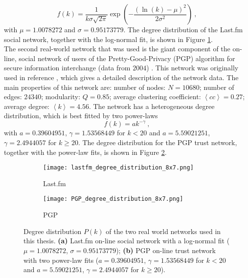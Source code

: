 \documentclass[11 pt , letterpaper , twoside , openright]{book}
\begin{document}
\begin{equation}
	f(k) = \frac{1}{k \sigma \sqrt{2\pi}} \exp(-\frac{(\ln(k) - \mu)^2}{2 \sigma^2})\ ,
\end{equation}
with $\mu = 1.0078272$ and $\sigma = 0.95173779$. The degree distribution of the Last.fm social network, together with the log-normal fit, is shown in Figure \ref{deg_distr_lastfm}.\\
\newline
The second real-world network that was used is the giant component of the on-line, social network of users of the Pretty-Good-Privacy (PGP) algorithm for secure information interchange (data from $2004$) \cite{ICON}. This network was originally used in reference \cite{Boguna2004}, which gives a detailed description of the network data. The main properties of this network are: number of nodes: $N = 10680$; number of edges: $24340$; modularity: $Q = 0.85$; average clustering coefficient: $\left<cc\right> = 0.27$; average degree: $\left<k\right> = 4.56$. The network has a heterogeneous degree distribution, which is best fitted by two power-laws
\begin{equation}
 f(k) = a k^{-\gamma} \ ,
\end{equation}
with $a = 0.39604951$, $\gamma = 1.53568449$ for $k < 20$ and $a = 5.59021251$, $\gamma = 2.4944057$ for $k \geqslant 20$. The degree distribution for the PGP trust network, together with the power-law fits, is shown in Figure \ref{deg_distr_pgp}. 

\begin{figure}[H]
  \begin{subfigure}[b]{0.49\textwidth}
    \caption{Last.fm}
    \texttt{[image: lastfm\_degree\_distribution\_8x7.png]}
    \label{deg_distr_lastfm}
  \end{subfigure}
  \begin{subfigure}[b]{0.49\textwidth}
    \caption{PGP}
    \texttt{[image: PGP\_degree\_distribution\_8x7.png]}
    \label{deg_distr_pgp}
  \end{subfigure}
  \captionsetup{format=plain}
  \caption[Degree distribution $P(k)$ of the two real-world networks used in this thesis.]{Degree distribution $P(k)$ of the two real world networks used in this thesis. \textbf{(a)} Last.fm on-line social network with a log-normal fit ($\mu = 1.0078272$, $\sigma = 0.95173779$); \textbf{(b)} PGP on-line trust network with two power-law fits ($a = 0.39604951$, $\gamma = 1.53568449$ for $k < 20$ and $a = 5.59021251$, $\gamma = 2.4944057$ for $k \geqslant 20$).}
\label{ev_op_50_50}
\end{figure}
\end{document}
